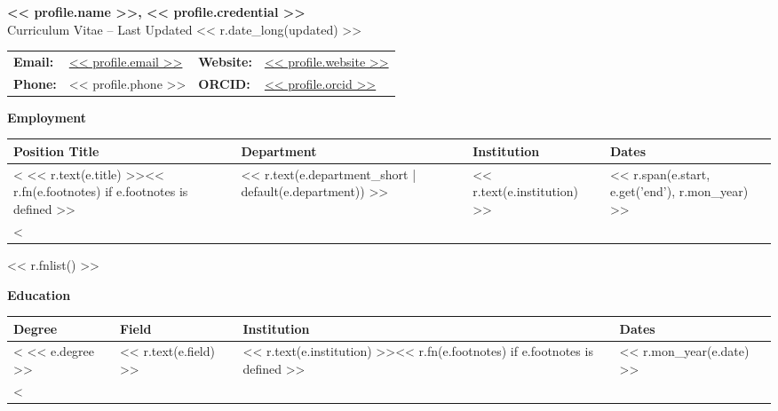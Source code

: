 \documentclass[11pt]{article}
\begin{document}

\begin{center}
    {\Large\textbf{<< profile.name >>, << profile.credential >>}}\\[0.5em]
    {\large Curriculum Vitae -- Last Updated << r.date_long(updated) >>}
\end{center}

{\normalsize
\begin{center}
    \begin{tabular}{@{}p{2.0cm} p{5.5cm} p{2.0cm} p{5.5cm}@{}}
        \textbf{Email:} & \href{mailto:<< profile.email >>}{<< profile.email >>} &
        \textbf{Website:} & \href{<< profile.website >>}{<< profile.website >>} \\
        \textbf{Phone:} & << profile.phone >> &
        \textbf{ORCID:} & \href{https://orcid.org/<< profile.orcid >>}{<< profile.orcid >>} \\
    \end{tabular}
\end{center}
}

\medskip


{\Large\textbf{Employment}}

{\normalsize
\begin{tabular}{@{}p{3.8cm} p{4.4cm} p{5.3cm} p{3.0cm}@{}}
    \toprule
    \textbf{Position Title} & \textbf{Department} & \textbf{Institution} & \textbf{Dates} \\
    \midrule
<%
    << r.text(e.title) >><< r.fn(e.footnotes) if e.footnotes is defined >> & << r.text(e.department_short | default(e.department)) >> & << r.text(e.institution) >> & {\small << r.span(e.start, e.get('end'), r.mon_year) >>} \\
<%
    \bottomrule
\end{tabular}
}

<< r.fnlist() >>

\medskip

{\Large\textbf{Education}}

{\normalsize
\begin{tabular}{@{}p{2.8cm} p{5.0cm} p{5.5cm} p{3.2cm}@{}}
    \toprule
    \textbf{Degree} & \textbf{Field} & \textbf{Institution} & \textbf{Dates} \\
    \midrule
<%
    << e.degree >> & << r.text(e.field) >> & << r.text(e.institution) >><< r.fn(e.footnotes) if e.footnotes is defined >> & << r.mon_year(e.date) >> \\
<%
    \bottomrule
\end{tabular}
}
\end{document}

